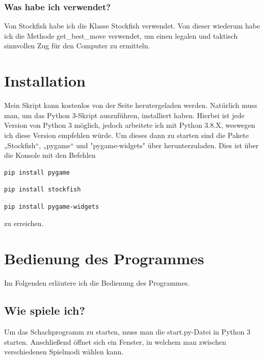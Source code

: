 \documentclass[a4paper, 10pt]{scrartcl}
\begin{document}
\subsubsection*{Was habe ich verwendet?}
Von Stockfish habe ich die Klasse \glqq Stockfish\grqq{} verwendet. 
Von dieser wiederum habe ich die Methode \glqq get\_best\_move\grqq{} verwendet,
um einen legalen und taktisch sinnvollen Zug für den Computer zu ermitteln. 


\section{Installation}
Mein Skript kann kostenlos von der Seite \href{https://github.com/Aetherion-dot/Chess_Python}{\color{blue}{github}} herutergeladen werden.
Natürlich muss man, um das Python 3-Skript auszuführen, \href{https://www.python.org/downloads/}{\color{blue}{python3}} installiert haben.
Hierbei ist jede Version von Python 3 möglich, jedoch arbeitete ich mit Python 3.8.X, weswegen ich diese Version empfehlen würde.
Um dieses dann zu starten sind die Pakete „Stockfish“, „pygame“ und "pygame-widgets" über \href{https://pypi.org/project/pip/}{\color{blue}{pip}} herunterzuladen.
Dies ist über die Konsole mit den Befehlen
\begin{lstlisting}[language=bash]
        pip install pygame
\end{lstlisting}
\begin{lstlisting}[language=bash]
        pip install stockfish
\end{lstlisting}
\begin{lstlisting}[language=bash]
        pip install pygame-widgets
\end{lstlisting}
zu erreichen.
\pagebreak
\section{Bedienung des Programmes}
Im Folgenden erläutere ich die Bedienung des Programmes.
\subsection{Wie spiele ich?}
Um das Schachprogramm zu starten, muss man die \glqq start.py\grqq{}-Datei in Python 3 starten. Anschließend öffnet sich ein Fenster, in welchem man zwischen verschiedenen Spielmodi
wählen kann.
\end{document}
